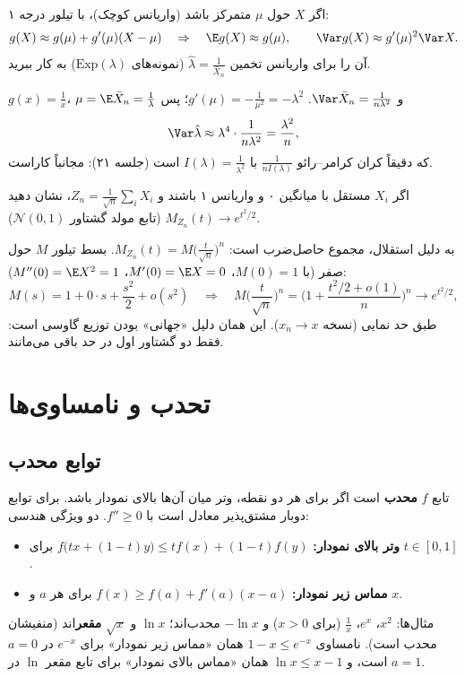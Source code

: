 \begin{example}
اگر $X$ حول $\mu$ متمرکز باشد (واریانس کوچک)، با تیلور درجه ۱:
\[
g(X)\approx g(\mu)+g'(\mu)(X-\mu)\quad\Rightarrow\quad\E g(X)\approx g(\mu),\qquad\Var g(X)\approx g'(\mu)^2\Var X .
\]
آن را برای واریانس تخمین $\hat\lambda=\frac{1}{\bar X_n}$ (نمونه‌های $\mathrm{Exp}(\lambda)$) به کار ببرید.
\begin{solution}
$g(x)=\frac1x$، $\mu=\E\bar X_n=\frac1\lambda$ و $\Var\bar X_n=\frac{1}{n\lambda^2}$. $g'(\mu)=-\frac{1}{\mu^2}=-\lambda^2$؛ پس
\[
\Var\hat\lambda\approx\lambda^4\cdot\frac{1}{n\lambda^2}=\frac{\lambda^2}{n},
\]
که دقیقاً کران کرامر--رائو $\frac{1}{nI(\lambda)}$ با $I(\lambda)=\frac{1}{\lambda^2}$ است (جلسه ۲۱):  مجانباً کاراست.
\end{solution}
\end{example}

\begin{example}
اگر $X_i$ مستقل با میانگین ۰ و واریانس ۱ باشند و $Z_n=\frac{1}{\sqrt n}\sum_iX_i$، نشان دهید $M_{Z_n}(t)\to e^{t^2/2}$ (تابع مولد گشتاور $\mathcal N(0,1)$).
\begin{solution}
به دلیل استقلال،  مجموع حاصل‌ضرب است: $M_{Z_n}(t)=M\big(\frac{t}{\sqrt n}\big)^n$. بسط تیلور $M$ حول صفر (با $M(0)=1$، $M'(0)=\E X=0$، $M''(0)=\E X^2=1$):
\[
M(s)=1+0\cdot s+\frac{s^2}{2}+o(s^2)\quad\Rightarrow\quad M\Big(\frac{t}{\sqrt n}\Big)^n=\Big(1+\frac{t^2/2+o(1)}{n}\Big)^n\to e^{t^2/2},
\]
طبق حد نمایی (نسخه $x_n\to x$). این همان دلیل «جهانی» بودن توزیع گاوسی است: فقط دو گشتاور اول در حد باقی می‌مانند.
\end{solution}
\end{example}

\section{تحدب و نامساوی‌ها}

\subsection{توابع محدب}
تابع $f$ \textbf{محدب} است اگر برای هر دو نقطه، وتر میان آن‌ها بالای نمودار باشد. برای توابع دوبار مشتق‌پذیر معادل است با $f''\ge0$. دو ویژگی هندسی:
\begin{itemize}
\item \textbf{وتر بالای نمودار:} $f\big(tx+(1-t)y\big)\le tf(x)+(1-t)f(y)$ برای $t\in[0,1]$.
\item \textbf{مماس زیر نمودار:} $f(x)\ge f(a)+f'(a)(x-a)$ برای هر $a$ و $x$.
\end{itemize}
مثال‌ها: $x^2$، $e^x$، $\frac1x$ (برای $x>0$) و $-\ln x$ محدب‌اند؛ $\ln x$ و $\sqrt x$ \textbf{مقعر}اند (منفیشان محدب است). نامساوی $1-x\le e^{-x}$ همان «مماس زیر نمودار» برای $e^{-x}$ در $a=0$ است، و $\ln x\le x-1$ همان «مماس بالای نمودار» برای تابع مقعر $\ln$ در $a=1$.

